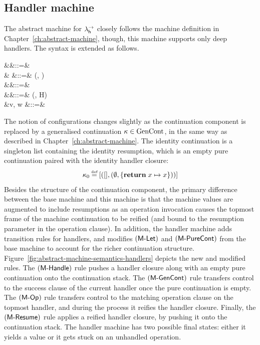 \documentclass[12pt,phd,lfcs,twoside,openright,logo,leftchapter,normalheadings]{infthesis}
\theoremstyle{plain}
\theoremstyle{definition}
\begin{document}
\subsection{Handler machine}
\label{sec:handler-machine}
\newcommand{\HClosure}{\dec{HClo}}
%
The abstract machine for $\lambda^\rightarrow_{\mathsf{h}}$ closely follows the machine
definition in Chapter~\ref{ch:abstract-machine}, though, this machine
supports only deep handlers.
%
The syntax is extended as follows.
%
{
\begin{syntax}
              &\conf \in \Conf &::=& \\
                 &\rho \in {} &::=& (\sigma, \chi)\\
               &\kappa \in \MGContCat &::=& \nil \mid \rho \cons \kappa\\
   &\chi \in \MGFrameCat  &::=& (\env, H) \\
     &v, w \in \MValCat  &::=& \cdots \mid \rho \\
\end{syntax}}%
%
The notion of configurations changes slightly as the continuation
component is replaced by a generalised continuation
$\kappa \in \textrm{GenCont}$, in the same way as described in
Chapter~\ref{ch:abstract-machine}.%
%
%
The identity continuation is a singleton list containing the identity
resumption, which is an empty pure continuation paired with the
identity handler closure:
%
{
\[
\kappa_0 \defas [(\nil, (\emptyset, \{\Return\;x \mapsto x\}))]
\]}%
%
Besides the structure of the continuation component, the primary
difference between the base machine and this machine is that the
machine values are augmented to include resumptions as an operation
invocation causes the topmost frame of the machine continuation to be
reified (and bound to the resumption parameter in the operation
clause).
%
In addition, the handler machine adds transition rules for handlers,
and modifies $(\mathsf{M\textrm{-}Let})$ and $(\mathsf{M\textrm{-}PureCont})$ from the base
machine to account for the richer continuation
structure. Figure~\ref{fig:abstract-machine-semantics-handlers}
depicts the new and modified rules.
%
The $(\mathsf{M\textrm{-}Handle})$ rule pushes a handler closure along with an
empty pure continuation onto the continuation stack.
%
The $(\mathsf{M\textrm{-}GenCont})$ rule transfers control to the success clause
of the current handler once the pure continuation is empty.
%
The $(\mathsf{M\textrm{-}Op})$ rule transfers control to the matching
operation clause on the topmost handler, and during the process it
reifies the handler closure. Finally, the $(\mathsf{M\textrm{-}Resume})$ rule
applies a reified handler closure, by pushing it onto the continuation
stack.
%
The handler machine has two possible final states: either it yields a
value or it gets stuck on an unhandled operation.
\end{document}
